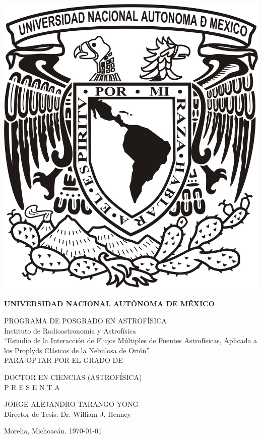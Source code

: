 \begin{center}
\includegraphics[width=0.2\linewidth]{./Figures/logoUNAM}

\large
\textbf{UNIVERSIDAD NACIONAL AUTÓNOMA DE MÉXICO}


PROGRAMA DE POSGRADO EN ASTROFÍSICA
\\[1.5\baselineskip]
Instituto de Radioastronomía y Astrofísica
\\[3\baselineskip]
``Estudio de la Interacción de Flujos Múltiples de Fuentes Astrofísicas, Aplicada
a los Proplyds Clásicos de la Nebulosa de Orión''
\\[3\baselineskip]



PARA OPTAR POR EL GRADO DE

DOCTOR EN CIENCIAS (ASTROFÍSICA)
\\[2\baselineskip]

P R E S E N T A

JORGE ALEJANDRO TARANGO YONG
\\[2\baselineskip]
Director de Tesis: Dr. William J. Henney
\\[2\baselineskip]
\normalsize


Morelia, Michoacán. \today

\end{center}


